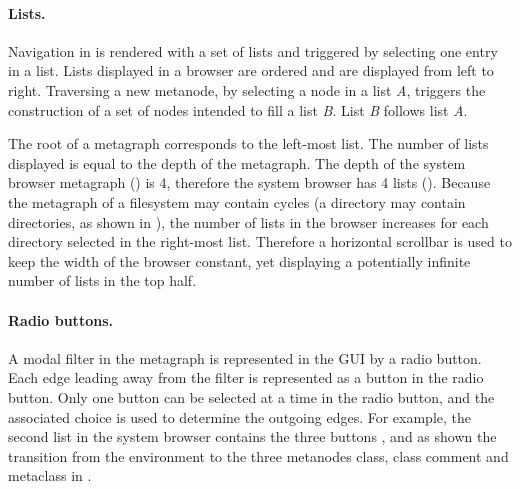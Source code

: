 \documentclass[a4paper,10pt,twoside]{book}
\begin{document}


\paragraph{Lists.} Navigation in \obf is rendered with a set of lists and triggered by selecting one entry in a list. Lists displayed in a browser are ordered and are displayed from left to right. Traversing a new metanode, by selecting a node in a list \textit{A}, triggers the construction of a set of nodes intended to fill a list \textit{B}. List \textit{B} follows list \textit{A}.

The root of a metagraph corresponds to the left-most list. The number of lists displayed is equal to the depth of the metagraph. The depth of the system browser metagraph () is 4, therefore the system browser has 4 lists (). Because the metagraph of a filesystem may contain cycles (\ie a directory may contain directories, as shown in ), the number of lists in the browser increases for each directory selected in the right-most list. Therefore a horizontal scrollbar is used to keep the width of the browser constant, yet displaying a potentially infinite number of lists in the top half.

\paragraph{Radio buttons.} A modal filter in the metagraph is represented in the GUI by a radio button. Each edge leading away from the filter is represented as a button in the radio button. Only one button can be selected at a time in the radio button, and the associated choice is used to determine the outgoing edges. For example, the second list in the system browser contains the three buttons ,  and  as shown the transition from the environment to the three metanodes class, class comment and metaclass in .
\end{document}
